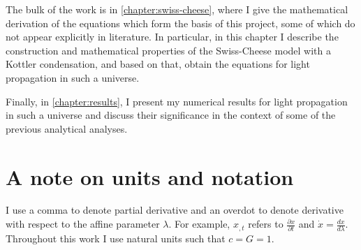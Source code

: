 The bulk of the work is in \autoref{chapter:swiss-cheese}, where I give the mathematical derivation of the equations which form the basis of this project, some of which do not appear explicitly in literature. In particular, in this chapter I describe the construction and mathematical properties of the Swiss-Cheese model with a Kottler condensation, and based on that, obtain the equations for light propagation in such a universe. 

Finally, in \autoref{chapter:results}, I present my numerical results for light propagation in such a universe and discuss their significance in the context of some of the previous analytical analyses. 

\section{A note on units and notation}
I use a comma to denote partial derivative and an overdot to denote derivative with respect to the affine parameter $\lambda$. For example, $x_{,t}$ refers to $\frac{\partial x}{\partial t}$ and $\dot{x} = \frac{dx}{d\lambda}$. Throughout this work I use natural units such that $c = G = 1$. 
